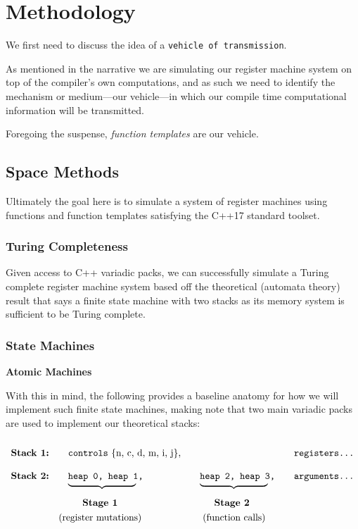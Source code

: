 \documentclass[twoside]{article}
\newcommand{\strong}[1]{{\bfseries #1}}
\newcommand{\bfmbox}[1]{\mbox{\bfseries #1}}
\newcommand{\tab}[1][1.125cm]{\hspace{#1}}
\newcommand{\col}[1][0ex]{& \hspace{#1}}
\begin{document}
\section*{Methodology}

We first need to discuss the idea of a \texttt{vehicle of transmission}.

As mentioned in the narrative we are simulating our register machine system on top of the compiler's own computations,
and as such we need to identify the mechanism or medium---our vehicle---in which our compile time computational
information will be transmitted.

Foregoing the suspense, \emph{function templates} are our vehicle.

\subsection*{Space Methods}

Ultimately the goal here is to simulate a system of register machines using functions and function templates
satisfying the C++17 standard toolset.

\subsubsection*{Turing Completeness}

Given access to C++ variadic packs, we can successfully simulate a Turing complete register machine system based off the
theoretical (automata theory) result that says a finite state machine with two stacks as its memory system is sufficient
to be Turing complete.

\subsubsection*{State Machines}

\strong{Atomic Machines}

With this in mind, the following provides a baseline anatomy for how we will implement such finite
state machines, making note that two main variadic packs are used to implement our theoretical stacks:

$$ \def\arraystretch{2}
\tab[0cm] \begin{array}{llll}
\bfmbox{Stack 1:} \col[1em]   \texttt{controls}\mbox{ \{n, c, d, m, i, j\},}             \col\col[1em] \texttt{registers\ldots} \\
\bfmbox{Stack 2:} \col[1em]   \texttt{heap 0, heap 1,}  \col[1em]   \texttt{heap 2, heap 3,} \col[1em] \texttt{arguments\ldots} \\[-2em]
		  \col[1em]   \underbrace{\tab[2.5cm]}  \col[1em]   \underbrace{\tab[2.5cm]}                                    \\
		  \col[2.5em] \bfmbox{Stage 1}          \col[2.5em] \bfmbox{Stage 2}                                            \\[-2ex]
		  \col      \mbox{(register mutations)} \col[3ex] \mbox{(function calls)}
\end{array} $$
\end{document}
